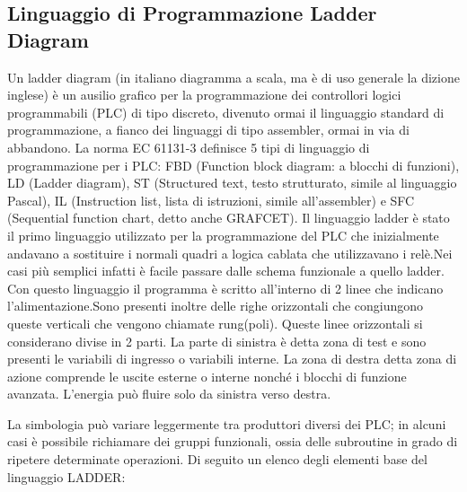 \documentclass[12pt, a4paper, oneside]{book}
\begin{document}
\subsection{Linguaggio di Programmazione Ladder Diagram}
Un ladder diagram (in italiano diagramma a scala, ma è di uso generale la dizione inglese) è un ausilio grafico per la programmazione dei controllori logici programmabili (PLC) di tipo discreto, divenuto ormai il linguaggio standard di programmazione, a fianco dei linguaggi di tipo assembler, ormai in via di abbandono. La norma EC 61131-3 definisce 5 tipi di linguaggio di programmazione per i PLC: FBD (Function block diagram: a blocchi di funzioni), LD (Ladder diagram), ST (Structured text, testo strutturato, simile al linguaggio Pascal), IL (Instruction list, lista di istruzioni, simile all'assembler) e SFC (Sequential function chart, detto anche GRAFCET). Il linguaggio ladder è stato il primo linguaggio utilizzato per la programmazione del PLC che inizialmente andavano a sostituire i normali quadri a logica cablata che utilizzavano i relè.Nei casi più semplici infatti è facile passare dalle schema funzionale a quello ladder. Con questo linguaggio il programma è scritto all'interno di 2 linee che indicano l'alimentazione.Sono presenti inoltre delle righe orizzontali che congiungono queste verticali che vengono chiamate rung(poli). Queste linee orizzontali si considerano divise in 2 parti. La parte di sinistra è detta zona di test e sono presenti le variabili di ingresso o variabili interne. La zona di destra detta zona di azione comprende le uscite esterne o interne nonché i blocchi di funzione avanzata. L'energia può fluire solo da sinistra verso destra.

La simbologia può variare leggermente tra produttori diversi dei PLC; in alcuni casi è possibile richiamare dei gruppi funzionali, ossia delle subroutine in grado di ripetere determinate operazioni. Di seguito un elenco degli elementi base del linguaggio LADDER:
\end{document}
